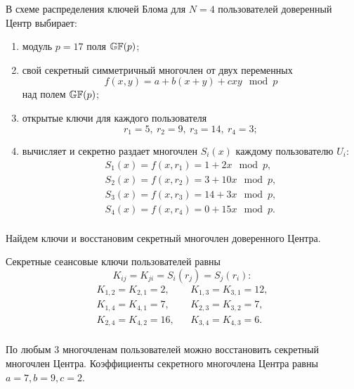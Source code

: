 \example
В схеме распределения ключей Блома для $N=4$ пользователей доверенный Центр выбирает:
\begin{enumerate}
    \item модуль $p = 17$ поля $\mathbb{GF}(p)$;
    \item свой секретный симметричный многочлен от двух переменных
        \[ f(x,y) = a + b (x + y) + c x y \mod p \]
        над полем $\mathbb{GF}(p)$;
    \item открытые ключи для каждого пользователя
        \[ r_1 = 5, ~ r_2 = 9, ~ r_3 = 14, ~ r_4 = 3; \]
    \item вычисляет и секретно раздает многочлен $S_i(x)$ каждому пользователю $U_i$:
        \[ \begin{array}{l}
            S_1(x) = f(x, r_1) = 1 + 2x \mod p, \\
            S_2(x) = f(x, r_2) = 3 + 10x \mod p, \\
            S_3(x) = f(x, r_3) = 14 + 3x \mod p, \\
            S_4(x) = f(x, r_4) = 0 + 15x \mod p. \\
        \end{array} \]
\end{enumerate}
Найдем ключи и восстановим секретный многочлен доверенного Центра.

Секретные сеансовые ключи пользователей равны
    \[ K_{ij} = K_{ji} = S_i(r_j) = S_j(r_i): \]
\[ \begin{array}{lcl}
    K_{1,2} = K_{2,1} = 2, & & K_{1,3} = K_{3,1} = 12, \\
    K_{1,4} = K_{4,1} = 7, & & K_{2,3} = K_{3,2} = 7, \\
    K_{2,4} = K_{4,2} = 16, & & K_{3,4} = K_{4,3} = 6. \\
\end{array} \]

По любым 3 многочленам пользователей можно восстановить секретный многочлен Центра. Коэффициенты секретного многочлена Центра равны $a=7, b=9, c=2$.
\exampleend

%
%
%
%
